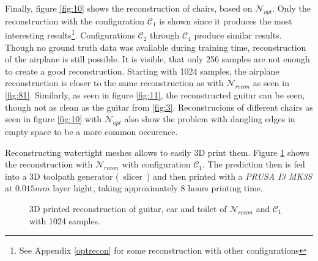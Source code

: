 %
  Finally, figure \ref{fig:10} shows the reconstruction of chairs, based on $\mathcal{N}_{opt}$. Only the reconstruction with the configuration $\mathcal{C}_1$ is shown
  since it produces the most interesting results\footnote{See Appendix \ref{optrecon} for some reconstruction with other configurations}. Configurations $\mathcal{C}_2$ through $\mathcal{C}_4$ produce similar results. Though no ground truth data was available during training time, reconstruction
  of the airplane is still possible. It is visible, that only 256 samples are not enough to create a good reconstruction. Starting with 1024 samples, the airplane reconstruction
  is closer to the same reconstruction as with $\mathcal{N}_{recon}$ as seen in \ref{fig:81}. Similarly, as seen in figure \ref{fig:11}, the reconstructed guitar can be 
  seen, though not as clean as the guitar from \ref{fig:3}. Reconstrucions of different chairs as seen in figure \ref{fig:10} with $\mathcal{N}_{opt}$ also show the problem with dangling edges in empty space
  to be a more common occurence. 


  Reconstructing watertight meshes allows to easily 3D print them. Figure \ref{fig:13} shows the reconstruction with $\mathcal{N}_{recon}$ with configuration $\mathcal{C}_1$. 
  The prediction then is fed into a 3D toolpath generator (~slicer~)\cite{Ranellucci2011} and then printed with a \emph{PRUSA I3 MK3S} at $0.015mm$ layer hight, taking approximately 8 hours printing time.
  \begin{figure}[htbp]
    \centering
    \caption{3D printed reconstruction of guitar, car and toilet of $\mathcal{N}_{recon}$ and $\mathcal{C}_1$ with 1024 samples.} \label{fig:13}
  \end{figure}
